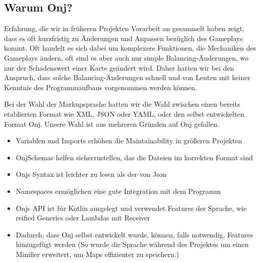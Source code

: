 
\subsection{Warum Onj?}\label{subsec:warum-onj}

\renewcommand{\kapitelautor}{Autor: Marvin Kurka}

Erfahrung, die wir in früheren Projekten \bzw Vorarbeit an \FF gesammelt haben zeigt, dass
es oft kurzfristig zu Änderungen und Anpassen bezüglich des Gameplays kommt.
Oft handelt es sich dabei um komplexere Funktionen, die Mechaniken des Gameplays ändern, oft sind es aber auch nur
simple Balancing-Änderungen, wo \zB nur der Schadenswert einer Karte geändert wird.
Daher hatten wir bei \FF den Anspruch, dass solche Balancing-Änderungen schnell und von Leuten mit keiner Kenntnis
des Programmaufbaus vorgenommen werden können.

Bei der Wahl der Markupsprache hatten wir die Wahl zwischen einen bereits etablierten Format wie XML, JSON oder YAML,
oder den selbst entwickelten Format Onj.
Unsere Wahl ist aus mehreren Gründen auf Onj gefallen.

\begin{itemize}
    \item Variablen und Imports erhöhen die Maintainability in größeren Projekten
    \item OnjSchemas helfen sicherzustellen, das die Dateien im korrekten Format sind
    \item Onjs Syntax ist leichter zu lesen als \zB der von Json
    \item Namespaces ermöglichen eine gute Integration mit dem Programm
    \item Onjs API ist für Kotlin ausgelegt und verwendet Features der Sprache, wie reified Generics oder
        Lambdas mit Receiver
    \item Dadurch, dass Onj selbst entwickelt wurde, können, falls notwendig, Features hinzugefügt werden (So wurde die
        Sprache \zB während des Projektes um einen Minifier erweitert, um Maps effizienter zu speichern.)
\end{itemize}

\renewcommand{\kapitelautor}{}

